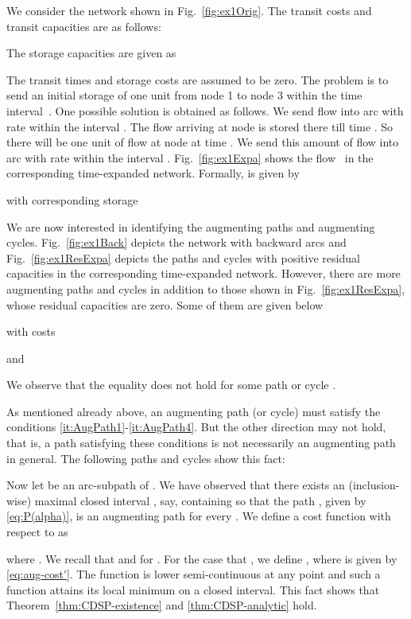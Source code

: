 \documentclass{svjour3}                     \smartqed
\begin{document}
\begin{example}
We consider the network shown in Fig.~\ref{fig:ex1Orig}.
The transit costs and transit capacities are as follows:

The storage capacities are given as

The transit times and storage costs are assumed to be zero. The problem is to send an initial storage of one
unit from node 1 to node 3 within the time interval~. One possible solution  is obtained as follows. We send flow into arc  with rate  within the interval . The flow arriving at node  is stored there till time . So there will be one unit of flow at node  at time . We send this amount of flow into arc  with rate  within the interval . Fig.~\ref{fig:ex1Expa} shows the flow~ in the corresponding time-expanded network.
Formally,  is given by

with corresponding storage


We are now interested in identifying the augmenting paths and augmenting cycles. Fig.~\ref{fig:ex1Back} depicts the network with backward arcs and Fig.~\ref{fig:ex1ResExpa} depicts the paths and cycles with positive residual capacities in the corresponding time-expanded network. However, there are more augmenting paths and cycles in addition to those shown in Fig.~\ref{fig:ex1ResExpa}, whose residual capacities are zero. Some of them are given below

with costs

and

We observe that the equality  does not hold for some path or cycle .

As mentioned already above, an augmenting path (or cycle) must satisfy the conditions \eqref{it:AugPath1}-\eqref{it:AugPath4}. But the other direction may not hold, that is,
a path satisfying these conditions is not necessarily an augmenting path in general. The following paths and cycles show this fact:


\end{example}


Now let  be an arc-subpath of . We have observed that there exists an (inclusion-wise) maximal closed interval , say, containing  so that the path , given by \eqref{eq:P(alpha)}, is an augmenting path for every . We define a cost function  with respect to  as

where . We recall that  and  for . For the case that , we define , where  is given by \eqref{eq:aug-cost'}. The function  is lower semi-continuous at any point  and such a function attains its local minimum on a closed interval. This fact shows that Theorem~\ref{thm:CDSP-existence} and \ref{thm:CDSP-analytic} hold.
\end{document}
